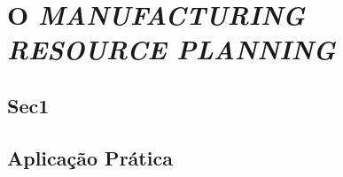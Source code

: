 \chapter{O \textit{MANUFACTURING RESOURCE PLANNING}}
\label{chap:manufacturing_resource_planning}


\section{Sec1}
\label{sec:manufacturing_resource_sec1}



\section{Aplicação Prática}
\label{sec:manufacturing_resource_planning_aplicacao}
